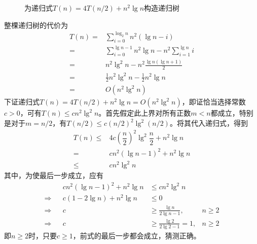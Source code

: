 \documentclass{article}
\begin{document}
\begin{figure}
\begin{tikzpicture}
    \end{tikzpicture}
    \caption{为递归式$T(n)=4T(n/2)+n^2\lg{n}$构造递归树}
    \label{fig:2}
\end{figure}
整棵递归树的代价为
\begin{align*}
    T(n) =& \sum_{i=0}^{\log_2{n}}{n^2(\lg{n}-i)} \\
    =& \sum_{i=0}^{\lg{n} - 1}{n^2\lg{n}} - n^2\sum_{i=1}^{\lg{n}}{i} \\
    =& n^2 \lg^2{n} - n^2\frac{\lg{n}(\lg{n}+1)}{2} \\
    =& \frac{1}{2} n^2 \lg^2{n} - \frac{1}{2} n^2 \lg{n} \\
    =& O(n^2\lg^2{n})
\end{align*}
下证递归式$T(n)=4T(n/2)+n^2\lg{n} = O(n^2\lg^2{n})$，即证恰当选择常数$c>0$，可有$T(n) \leq cn^2\lg^2{n}$。首先假定此上界对所有正数$m<n$都成立，特别是对于$m = n / 2$，有$T(n/2) \leq c (n/2)^2 \lg^2{(n/2)}$。将其代入递归式，得到
\begin{align*}
    T(n) \leq& 4c \left( \dfrac{n}{2} \right)^2 \lg^2{\dfrac{n}{2}} + n^2\lg{n}\\
    =& cn^2(\lg{n} - 1)^2 + n^2\lg{n}\\
    \leq& cn^2\lg^2{n}
\end{align*}
其中，为使最后一步成立，应有
\begin{align*}
    && cn^2(\lg{n} - 1)^2 + n^2\lg{n} &\leq cn^2\lg^2{n} & \\
    \Rightarrow && c(1 - 2\lg{n}) + n^2\lg{n} &\leq 0 & \\
    \Rightarrow && c &\geq \frac{\lg{n}}{2\lg{n} - 1}, & n \geq 2 \\
    \Rightarrow && c &\geq \frac{\lg{2}}{2\lg{2} - 1} = 1, & n \geq 2
\end{align*}
即$n \geq 2 $时，只要$c \geq 1$，前式的最后一步都会成立，猜测正确。
\FloatBarrier
\\
\end{document}
